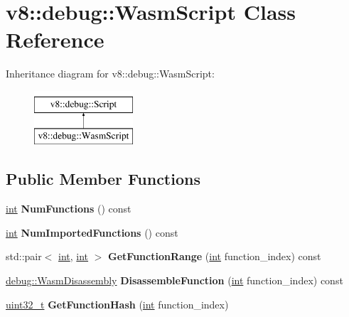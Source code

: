 \hypertarget{classv8_1_1debug_1_1WasmScript}{}\section{v8\+:\+:debug\+:\+:Wasm\+Script Class Reference}
\label{classv8_1_1debug_1_1WasmScript}
Inheritance diagram for v8\+:\+:debug\+:\+:Wasm\+Script\+:\begin{figure}[H]
\begin{center}
\leavevmode
\includegraphics[height=2.000000cm]{classv8_1_1debug_1_1WasmScript}
\end{center}
\end{figure}
\subsection*{Public Member Functions}
\begin{DoxyCompactItemize}
\item 
\mbox{\label{classv8_1_1debug_1_1WasmScript_a8323360da1e88abaa8af6f86d30bba6f}} 
\mbox{\hyperlink{classint}{int}} {\bfseries Num\+Functions} () const
\item 
\mbox{\label{classv8_1_1debug_1_1WasmScript_a85bb97744988eb548bd0a2e4874b11ed}} 
\mbox{\hyperlink{classint}{int}} {\bfseries Num\+Imported\+Functions} () const
\item 
\mbox{\label{classv8_1_1debug_1_1WasmScript_a9f3c2ec0378d0a42ae7254fc53d8e4db}} 
std\+::pair$<$ \mbox{\hyperlink{classint}{int}}, \mbox{\hyperlink{classint}{int}} $>$ {\bfseries Get\+Function\+Range} (\mbox{\hyperlink{classint}{int}} function\+\_\+index) const
\item 
\mbox{\label{classv8_1_1debug_1_1WasmScript_a9b54928c58198ae9aac25fa5433fba2d}} 
\mbox{\hyperlink{structv8_1_1debug_1_1WasmDisassembly}{debug\+::\+Wasm\+Disassembly}} {\bfseries Disassemble\+Function} (\mbox{\hyperlink{classint}{int}} function\+\_\+index) const
\item 
\mbox{\label{classv8_1_1debug_1_1WasmScript_af6a1a5a518ff5928775c4ad5c57b8b09}} 
\mbox{\hyperlink{classuint32__t}{uint32\+\_\+t}} {\bfseries Get\+Function\+Hash} (\mbox{\hyperlink{classint}{int}} function\+\_\+index)
\end{DoxyCompactItemize}
